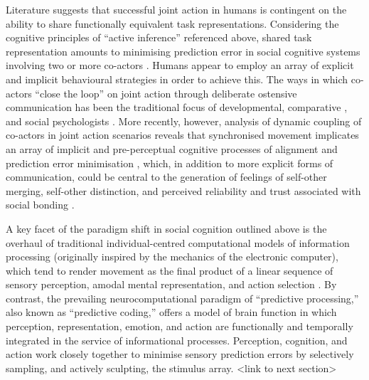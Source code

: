 Literature suggests that successful joint action in humans is contingent on the ability to share functionally equivalent task representations. Considering the cognitive principles of ``active inference'' referenced above, shared task representation amounts to minimising prediction error in social cognitive systems involving two or more co-actors \citep{Semin2008,Frith2010}.  Humans appear to employ an array of explicit and implicit behavioural strategies in order to achieve this.  The ways in which co-actors ``close the loop'' \citep{Frith2007} on joint action through deliberate ostensive communication has been the traditional focus of developmental, comparative \cite{Tomasello2005a}, and social psychologists \citep{Sebanz2006}.
More recently, however, analysis of dynamic coupling of co-actors in joint action scenarios reveals that synchronised movement implicates an array of implicit and pre-perceptual cognitive processes of alignment and prediction error minimisation \citep{Schmidt2011}, which, in addition to more explicit forms of communication, could be central to the generation of feelings of self-other merging, self-other distinction, and perceived reliability and trust associated with social bonding \citep{Marsh2009}.








A key facet of the paradigm shift in social cognition outlined above is the overhaul of traditional individual-centred computational models of information processing (originally inspired by the mechanics of the electronic computer), which tend to render movement as the final product of a linear sequence of sensory perception, amodal mental representation, and action selection \citep{Lewis2005}.  By contrast, the prevailing neurocomputational paradigm of ``predictive processing,'' also known as ``predictive coding,'' \citep[see][]{Frith2007,Kilner2009,Clark2013} offers a model of brain function in which perception, representation, emotion, and action are functionally and temporally integrated in the service of informational processes.  Perception, cognition, and action work closely together to minimise sensory prediction errors by selectively sampling, and actively sculpting, the stimulus array. <link to next section>








